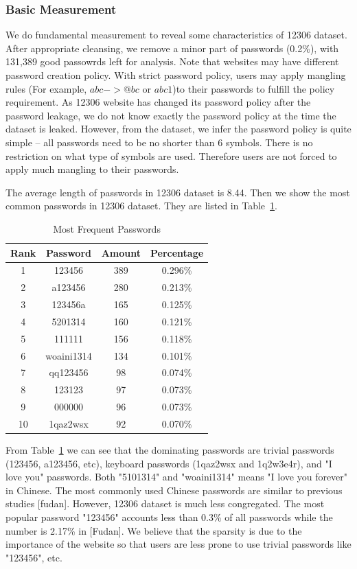 \documentclass{sig-alternate}
\begin{document}
\subsubsection{Basic Measurement}
We do fundamental measurement to reveal some characteristics of 12306 dataset. After appropriate cleansing, we remove a minor part of passwords (0.2\%), with 131,389 good passowrds left for analysis. Note that websites may have different password creation policy. With strict password policy, users may apply mangling rules (For example, $abc -> @bc$ or $abc1$)to their passwords to fulfill the policy requirement. As 12306 website has changed its password policy after the password leakage, we do not know exactly the password policy at the time the dataset is leaked. However, from the dataset, we infer the password policy is quite simple -- all passwords need to be no shorter than 6 symbols. There is no restriction on what type of symbols are used. Therefore users are not forced to apply much mangling to their passwords. 

The average length of passwords in 12306 dataset is 8.44. Then we show the most common passwords in 12306 dataset. They are listed in Table~\ref{t1}.
\begin{table}
\centering
\caption{Most Frequent Passwords}
\begin{tabular}{|c|c|c|c|} \hline
Rank&Password&Amount&Percentage\\ \hline
1&123456&389&0.296\%\\ 
2&a123456&280&0.213\%\\ 
3&123456a&165&0.125\%\\ 
4&5201314&160&0.121\%\\ 
5&111111&156&0.118\%\\ 
6&woaini1314&134&0.101\%\\ 
7&qq123456&98&0.074\%\\ 
8&123123&97&0.073\%\\ 
9&000000&96&0.073\%\\ 
10&1qaz2wsx&92&0.070\%\\ 
\hline\end{tabular}
\label{t1}
\end{table}

From Table~\ref{t1} we can see that the dominating passwords are trivial passwords (123456, a123456, etc), keyboard passwords (1qaz2wsx and 1q2w3e4r), and "I love you" passwords. Both "5101314" and "woaini1314" means "I love you forever" in Chinese. The most commonly used Chinese passwords are similar to previous studies [fudan]. However, 12306 dataset is much less congregated. The most popular password "123456" accounts less than 0.3\% of all passwords while the number is 2.17\% in [Fudan]. We believe that the sparsity is due to the importance of the website so that users are less prone to use trivial passwords like "123456", etc. 
\end{document}
